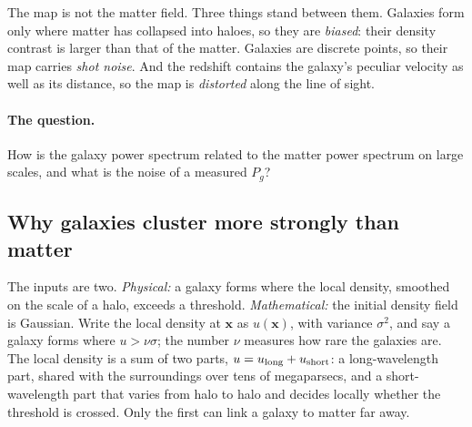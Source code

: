 The map is not the matter field. Three things stand between them. Galaxies form only where matter has collapsed into haloes, so they are \emph{biased}: their density contrast is larger than that of the matter. Galaxies are discrete points, so their map carries \emph{shot noise}. And the redshift contains the galaxy's peculiar velocity as well as its distance, so the map is \emph{distorted} along the line of sight.

\paragraph{The question.} How is the galaxy power spectrum related to the matter power spectrum on large scales, and what is the noise of a measured $P_g$?

\subsection{Why galaxies cluster more strongly than matter}

The inputs are two. \emph{Physical:} a galaxy forms where the local density, smoothed on the scale of a halo, exceeds a threshold. \emph{Mathematical:} the initial density field is Gaussian. Write the local density at $\bm x$ as $u(\bm x)$, with variance $\sigma^2$, and say a galaxy forms where $u>\nu\sigma$; the number $\nu$ measures how rare the galaxies are. The local density is a sum of two parts, $u=u_{\rm long}+u_{\rm short}$: a long-wavelength part, shared with the surroundings over tens of megaparsecs, and a short-wavelength part that varies from halo to halo and decides locally whether the threshold is crossed. Only the first can link a galaxy to matter far away.

